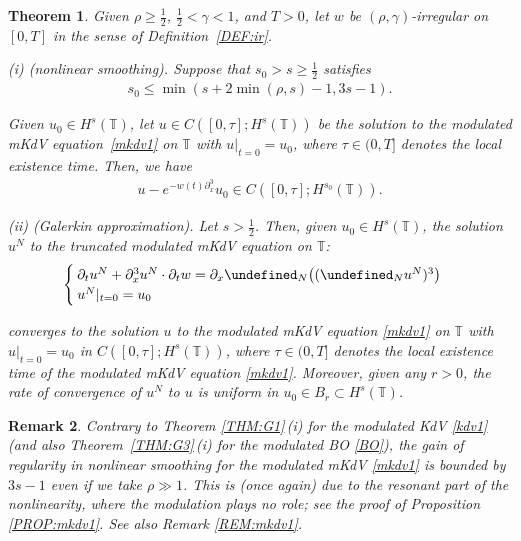 \documentclass[letterpaper, 11pt,  reqno]{amsart}
\newtheorem{theorem}{Theorem} [section]
\newtheorem{remark}[theorem]{Remark}
\newcommand{\1}{\hspace{0.5mm}\text{I}\hspace{0.5mm}}
\newcommand{\noi}{\noindent}
\newcommand{\T}{\mathbb{T}}
\let\P= \undefined
\newcommand{\P}{\mathbf{P}}
\newcommand{\g}{\gamma}
\newcommand{\dx}{\partial_x}
\newcommand{\dt}{\partial_t}
\numberwithin{equation}{section}
\numberwithin{theorem}{section}
\begin{document}
\begin{theorem}\label{THM:G2}
Given $\rho \ge\frac 12$,  $\frac12< \g < 1$, and $T> 0$, 
let  $w$ be $(\rho,\g)$-irregular on $[0, T]$ in the sense of Definition~\ref{DEF:ir}.



\smallskip

\noi
\textup{(i) (nonlinear smoothing).}
Suppose that 
$s_0 > s \ge \frac 12$ satisfies 
\begin{align}
 s_0 \le \min(s + 2 \min(\rho, s) - 1, 3s - 1).
\label{regM2}
\end{align}

\noi
Given $u_0 \in H^s(\T)$, 
let $u
\in C([0, \tau]; H^s(\T))$ be the  solution 
to the modulated mKdV equation~\eqref{mkdv1}
on $\T$
with $u|_{t = 0} = u_0$, 
where 
$\tau \in (0,  T]$ denotes the local existence time.
Then, we have 
\begin{align*}
 u - e^{-w(t) \dx^3}u_0 \in C([0, \tau]; H^{s_0}(\T)).
\end{align*}




\smallskip

\noi
\textup{(ii) (Galerkin approximation).}
Let 
$s > \frac 12$.
Then, given $u_0 \in H^s(\T)$, 
the solution $u^N$ to the truncated modulated mKdV equation 
on $\T$\textup{:}
\begin{equation*}
\begin{cases}
\dt u^N+  \dx^3 u^N \cdot \dt w =\dx \P_N\big((\P_Nu^N)^3\big)\\
u^N|_{t = 0} = u_0
\end{cases}
\end{equation*}


\noi
converges to the solution $u$
to the modulated mKdV equation \eqref{mkdv1}
on $\T$
with $u|_{t = 0} = u_0$
in $C([0, \tau]; H^s(\T))$, 
where $\tau  \in (0, T]$ denotes the local existence time of the modulated mKdV equation
\eqref{mkdv1}.
Moreover, 
given any $r > 0$, 
the rate of convergence of $u^N$ to $u$ is
uniform in $u_0 \in B_r \subset H^s(\T)$. 

\end{theorem}



\begin{remark}\label{REM:mkdv2}\rm
Contrary to Theorem \ref{THM:G1}\,(i) for
the modulated KdV \eqref{kdv1} (and also Theorem~\ref{THM:G3}\,(i) for 
the modulated BO \eqref{BO}), 
the gain of regularity 
in nonlinear smoothing for the modulated mKdV \eqref{mkdv1}
is bounded by $3s - 1$ even if we take $\rho \gg1$.
This is (once again) due to the resonant part of the nonlinearity, where
the modulation plays no role; 
see the proof of Proposition \ref{PROP:mkdv1}.
See also Remark \ref{REM:mkdv1}.

\end{remark}
\end{document}
